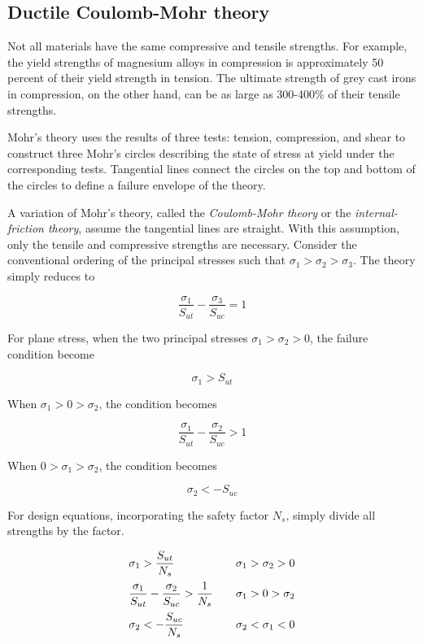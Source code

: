 \documentclass[a4paper,openany,12pt]{book}
\begin{document}
\subsection{Ductile Coulomb-Mohr theory}
\label{ductile-coulomb-mohr-theory}
Not all materials have the same compressive and tensile strengths. For
example, the yield strengths of magnesium alloys in compression is
approximately 50 percent of their yield strength in tension. The
ultimate strength of grey cast irons in compression, on the other hand,
can be as large as 300-400\% of their tensile strengths.

Mohr's theory uses the results of three tests: tension, compression, and
shear to construct three Mohr's circles describing the state of stress
at yield under the corresponding tests. Tangential lines connect the
circles on the top and bottom of the circles to define a failure
envelope of the theory.

A variation of Mohr's theory, called the \emph{Coulomb-Mohr theory} or the
\emph{internal-friction theory}, assume the tangential lines are straight.
With this assumption, only the tensile and compressive strengths are
necessary. Consider the conventional ordering of the principal stresses
such that \(\sigma_1 > \sigma_2 > \sigma_3\). The theory simply reduces to

$$\frac{\sigma_1}{S_{ut}} - \frac{\sigma_3}{S_{uc}} = 1$$

For plane stress, when the two principal stresses
\(\sigma_1 > \sigma_2 > 0\), the failure condition become

$$\sigma_1 > S_{ut}$$

When \(\sigma_1 > 0 > \sigma_2\), the condition becomes

$$\frac{\sigma_1}{S_{ut}} - \frac{\sigma_2}{S_{uc}} > 1$$

When \(0 > \sigma_1 > \sigma_2\), the condition becomes

$$\sigma_2 <  - S_{uc}$$


For design equations, incorporating the safety factor \(N_s\), simply
divide all strengths by the factor.

$$\begin{array}{l l l}
  \sigma_1 > \dfrac{S_{ut}}{N_s} & & \sigma_1 > \sigma_2 > 0 \\[10pt]
  \dfrac{\sigma_1}{S_{ut}} - \dfrac{\sigma_2}{S_{uc}} > \dfrac{1}{N_s} & & \sigma_1 > 0 > \sigma_2 \\[10pt]
    \sigma_2 <  -\dfrac{S_{uc}}{N_s} & & \sigma_2 < \sigma_1 < 0
  \end{array}$$
\end{document}
